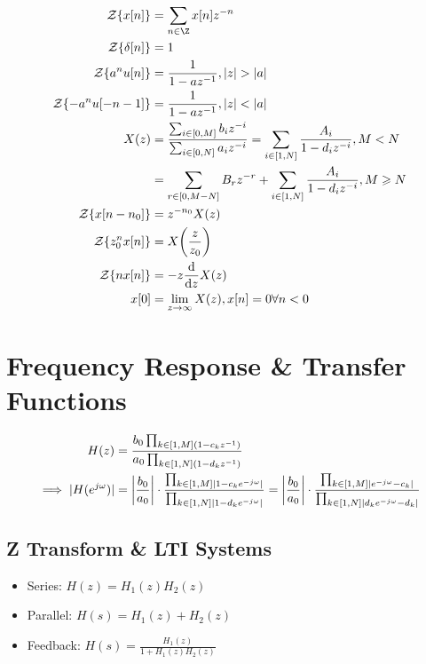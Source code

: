\documentclass{article}
\begin{document}
\begin{align}
    \mathcal{Z}\{x[n]\} &= \sum_{n \in \Z} x[n] z^{-n} \\
    \mathcal{Z}\{\delta[n]\} &= 1 \\
    \mathcal{Z}\{a^n u[n]\} &= \frac{1}{1 - az^{-1}}, |z| > |a| \\
    \mathcal{Z}\{-a^n u[-n - 1]\} &= \frac{1}{1 - az^{-1}}, |z| < |a| \\
    X(z) &= \frac{\sum_{i \in [0, M]} b_i z^{-i}}{\sum_{i \in [0, N]} a_i z^{-i}} = \sum_{i \in [1, N]} \frac{A_i}{1 - d_i z^{-i}}, M < N \\
    &= \sum_{r \in [0, M - N]} B_r z^{-r} + \sum_{i \in [1, N]} \frac{A_i}{1 - d_i z^{-i}}, M \geqslant N \\
    \mathcal{Z}\{x[n - n_0]\} &= z^{-n_0} X(z) \\
    \mathcal{Z}\{z_0^n x[n]\} &= X\qty(\frac{z}{z_0}) \\
    \mathcal{Z}\qty{n x[n]} &= -z \dv{z} X(z) \\
    x[0] &= \lim_{z \to \infty} X(z), x[n] = 0 \forall n < 0 \\
\end{align}

\section{Frequency Response \& Transfer Functions}

\begin{align}
    H(z) &= \frac{b_0 \prod_{k \in [1, M] (1 - c_k z^{-1})}}{a_0 \prod_{k \in [1, N] (1 - d_k z^{-1})}} \\
    \implies |H(e^{j \omega})| &= \qty|\frac{b_0}{a_0}| \cdot \frac{\prod_{k \in [1, M] |1 - c_k e^{-j \omega}|}}{\prod_{k \in [1, N] |1 - d_k e^{-j \omega}|}} = \qty|\frac{b_0}{a_0}| \cdot \frac{\prod_{k \in [1, M] |e^{-j \omega} - c_k|}}{\prod_{k \in [1, N] |d_k e^{-j \omega} - d_k|}} \\
\end{align}

\subsection{Z Transform \& LTI Systems}

\begin{itemize}
    \item Series: \(H(z) = H_1(z) H_2(z)\)
    \item Parallel: \(H(s) = H_1(z) + H_2(z)\)
    \item Feedback: \(H(s) = \frac{H_1(z)}{1 + H_1(z) H_2(z)}\)
\end{itemize}
\end{document}
